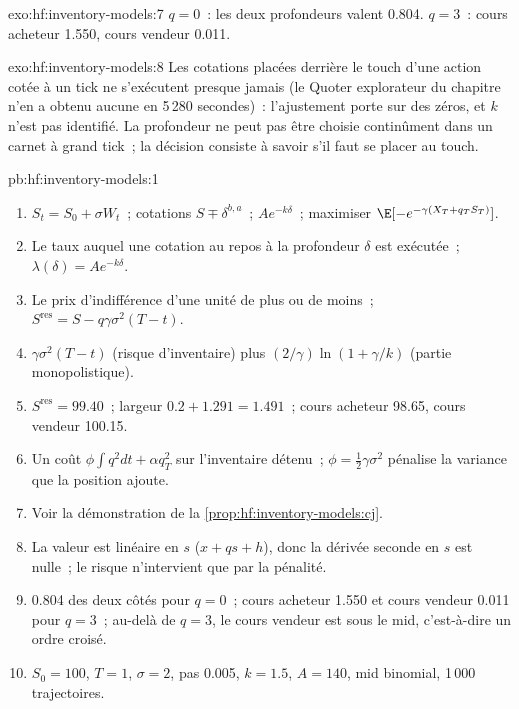 \begin{solution}{exo:hf:inventory-models:7}
$q=0$~: les deux profondeurs valent 0.804. $q=3$~: cours acheteur 1.550, cours vendeur 0.011.
\end{solution}

\begin{solution}{exo:hf:inventory-models:8}
Les cotations placées derrière le touch d'une action cotée à un tick ne s'exécutent presque jamais (le Quoter explorateur du chapitre n'en a obtenu aucune en 5\,280 secondes)~: l'ajustement porte sur des zéros,
et $k$ n'est pas identifié. La profondeur ne peut pas être choisie continûment dans un carnet à grand tick~; la décision consiste à savoir s'il faut se placer au touch.
\end{solution}

\begin{solution}{pb:hf:inventory-models:1}
\begin{enumerate}
\item $S_t=S_0+\sigma W_t$~; cotations $S\mp\delta^{b,a}$~;  $Ae^{-k\delta}$~; maximiser $\E[-e^{-\gamma(X_T+q_TS_T)}]$.
\item Le taux auquel une cotation au repos à la profondeur $\delta$ est exécutée~; $\lambda(\delta)=Ae^{-k\delta}$.
\item Le prix d'indifférence d'une unité de plus ou de moins~; $S^{\mathrm{res}}=S-q\gamma\sigma^2(T-t)$.
\item $\gamma\sigma^2(T-t)$ (risque d'inventaire) plus $(2/\gamma)\ln(1+\gamma/k)$ (partie monopolistique).
\item $S^{\mathrm{res}}=99.40$~; largeur $0.2+1.291=1.491$~; cours acheteur 98.65, cours vendeur 100.15.
\item Un coût $\phi\int q^2dt+\alpha q_T^2$ sur l'inventaire détenu~; $\phi=\tfrac12\gamma\sigma^2$ pénalise la variance que la position ajoute.
\item Voir la démonstration de la \cref{prop:hf:inventory-models:cj}.
\item La valeur est linéaire en $s$ ($x+qs+h$), donc la dérivée seconde en $s$ est nulle~; le risque n'intervient que par la pénalité.
\item 0.804 des deux côtés pour $q=0$~; cours acheteur 1.550 et cours vendeur 0.011 pour $q=3$~; au-delà de $q=3$, le cours vendeur est sous le mid, c'est-à-dire un ordre croisé.
\item $S_0=100$, $T=1$, $\sigma=2$, pas 0.005, $k=1.5$, $A=140$, mid binomial, 1\,000 trajectoires.

\end{enumerate}
\end{solution}
